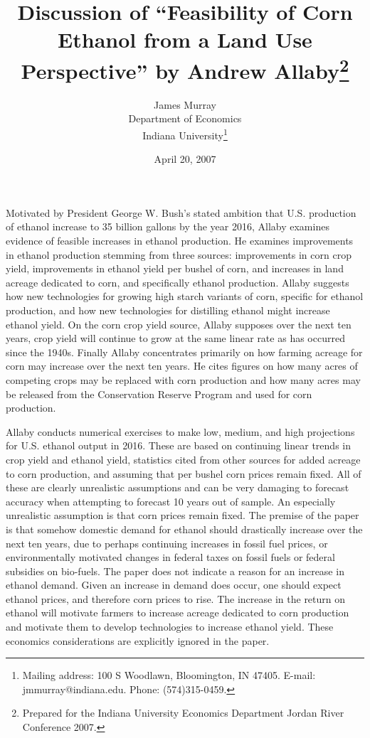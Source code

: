 \documentclass[12pt]{article}
\begin{document}
\begin{singlespace}
\title{Discussion of ``Feasibility of Corn Ethanol from a Land Use Perspective'' by Andrew Allaby\footnote{Prepared for the Indiana University Economics Department Jordan River Conference 2007.}}
\author{James Murray\\
Department of Economics\\
Indiana University\footnote{Mailing address: 100 S Woodlawn, Bloomington, IN  47405. E-mail: jmmurray@indiana.edu.  Phone: (574)315-0459.}}
\date{April 20, 2007}
\maketitle
\end{singlespace}

Motivated by President George W. Bush's stated ambition that U.S. production of ethanol increase to 35 billion gallons by the year 2016, Allaby examines evidence of feasible increases in ethanol production.  He examines improvements in ethanol production stemming from three sources: improvements in corn crop yield, improvements in ethanol yield per bushel of corn, and increases in land acreage dedicated to corn, and specifically ethanol production.  Allaby suggests how new technologies for growing high starch variants of corn, specific for ethanol production, and how new technologies for distilling ethanol might increase ethanol yield.  On the corn crop yield source, Allaby supposes over the next ten years, crop yield will continue to grow at the same linear rate as has occurred since the 1940s.  Finally Allaby concentrates primarily on how farming acreage for corn may increase over the next ten years.  He cites figures on how many acres of competing crops may be replaced with corn production and how many acres may be released from the Conservation Reserve Program and used for corn production.

Allaby conducts numerical exercises to make low, medium, and high projections for U.S. ethanol output in 2016.  These are based on continuing linear trends in crop yield and ethanol yield, statistics cited from other sources for added acreage to corn production, and assuming that per bushel corn prices remain fixed.  All of these are clearly unrealistic assumptions and can be very damaging to forecast accuracy when attempting to forecast 10 years out of sample.  An especially unrealistic assumption is that corn prices remain fixed.  The premise of the paper is that somehow domestic demand for ethanol should drastically increase over the next ten years, due to perhaps continuing increases in fossil fuel prices, or environmentally motivated changes in federal taxes on fossil fuels or federal subsidies on bio-fuels.  The paper does not indicate a reason for an increase in ethanol demand.  Given an increase in demand does occur, one should expect ethanol prices, and therefore corn prices to rise.  The increase in the return on ethanol will motivate farmers to increase acreage dedicated to corn production and motivate them to develop technologies to increase ethanol yield.  These economics considerations are explicitly ignored in the paper.  
\end{document}
